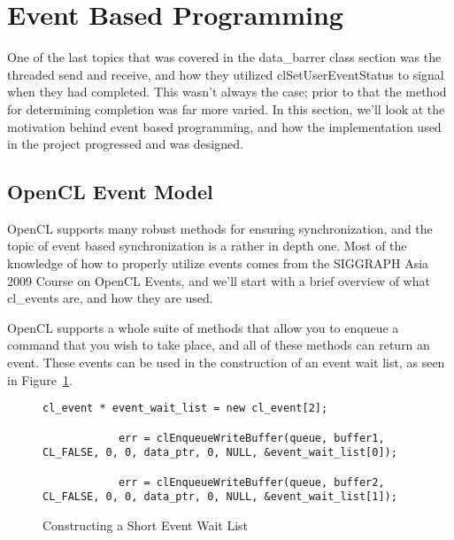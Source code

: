 \documentclass[report.tex]{subfiles}
\begin{document}
\section{Event Based Programming} %
\label{sec:event_based_programming}
    One of the last topics that was covered in the data\_barrer class section was the threaded send and receive, and how they utilized clSetUserEventStatus to signal when they had completed. This wasn't always the case; prior to that the method for determining completion was far more varied. In this section, we'll look at the motivation behind event based programming, and how the implementation used in the project progressed and was designed.

    \subsection{OpenCL Event Model} %
    \label{sub:opencl_event_model}
        OpenCL supports many robust methods for ensuring synchronization, and the topic of event based synchronization is a rather in depth one. Most of the knowledge of how to properly utilize events comes from the SIGGRAPH Asia 2009 Course on OpenCL Events\cite{advancedopenclevent}, and we'll start with a brief overview of what cl\_events are, and how they are used.

        OpenCL supports a whole suite of methods that allow you to enqueue a command that you wish to take place, and all of these methods can return an event. These events can be used in the construction of an event wait list, as seen in Figure~\ref{fig:event_wait_list_construction}.

        \begin{figure}[htbp]
            \centering

            \lstset{language=cpp}  
            \begin{lstlisting}[tabsize=2]
            cl_event * event_wait_list = new cl_event[2];

            err = clEnqueueWriteBuffer(queue, buffer1, CL_FALSE, 0, 0, data_ptr, 0, NULL, &event_wait_list[0]);

            err = clEnqueueWriteBuffer(queue, buffer2, CL_FALSE, 0, 0, data_ptr, 0, NULL, &event_wait_list[1]);
            \end{lstlisting}
            \caption{Constructing a Short Event Wait List}
            \label{fig:event_wait_list_construction}
        \end{figure}
\end{document}
